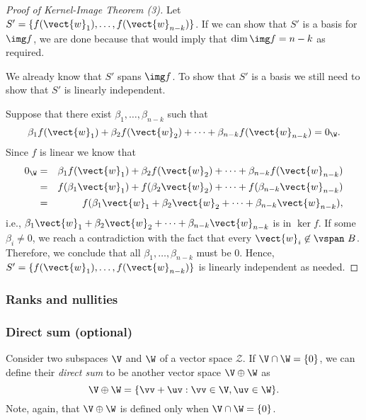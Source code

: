 \begin{frame}
  \begin{proof}[Proof of Kernel-Image Theorem (3)]
    {\small
      Let $S'=\{f(\vect{w}_1),\ldots,f(\vect{w}_{n-k})\}$.  If we can show
      that $S'$ is a basis for $\img f$, we are done because that would
      imply that $\dim\img f=n-k$ as required.

      We already know that $S'$ spans $\img f$.  To show that $S'$ is a
      basis we still need to show that $S'$ is linearly independent.
      
      Suppose that there exist $\beta_1,\ldots,\beta_{n-k}$ such that
      \[
      \beta_1f(\vect{w}_1) + \beta_2f(\vect{w}_2) + \cdots +
      \beta_{n-k}f(\vect{w}_{n-k}) = 0_\W.
      \]
      Since $f$ is linear we know that
      \begin{eqnarray*}
        0_\W &=&
        \beta_1f(\vect{w}_1) + \beta_2f(\vect{w}_2) + \cdots +
        \beta_{n-k}f(\vect{w}_{n-k})\\
        &=&
        f(\beta_1\vect{w}_1) + f(\beta_2\vect{w}_2) + \cdots +
        f(\beta_{n-k}\vect{w}_{n-k})\\
        &=&
        f(\beta_1\vect{w}_1 + \beta_2\vect{w}_2 + \cdots +
        \beta_{n-k}\vect{w}_{n-k}),
      \end{eqnarray*}
      i.e., $\beta_1\vect{w}_1 + \beta_2\vect{w}_2 + \cdots +
      \beta_{n-k}\vect{w}_{n-k}$ is in $\ker f$.  If some $\beta_i\neq 0$,
      we reach a contradiction with the fact that every
      $\vect{w}_i\not\in\vspan~B$.  Therefore, we conclude that all
      $\beta_1,\ldots,\beta_{n-k}$ must be 0.  Hence,
      $S'=\{f(\vect{w}_1),\ldots,f(\vect{w}_{n-k})\}$ is linearly
      independent as needed.
    }
  \end{proof}
\end{frame}

\begin{frame}
\frametitle{Ranks and nullities}
\end{frame}

\begin{frame}
\frametitle{Direct sum (optional)}

Consider two subspaces $\V$ and $\W$ of a vector space ${\mathcal Z}$.
If $\V\cap\W=\{0\}$, we can define their {\em direct sum} to be
another vector space $\V\oplus\W$ as
\[
\V\oplus\W = \{\vv+\uv : \vv\in\V, \uv\in\W\}.
\]
Note, again, that $\V\oplus\W$ is defined only when $\V\cap\W=\{0\}$.
\end{frame}


